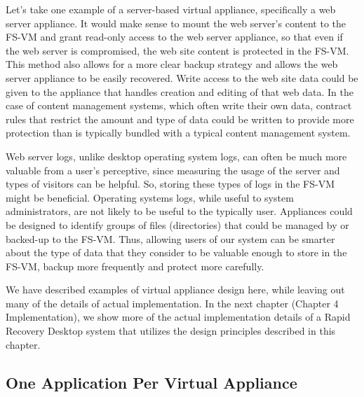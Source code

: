 Let's take one example of a server-based virtual appliance, specifically a web server appliance. It would make sense to mount the web server's content to the FS-VM and grant read-only access to the web server appliance, so that even if the web server is compromised, the web site content is protected in the FS-VM. This method also allows for a more clear backup strategy and allows the web server appliance to be easily recovered. Write access to the web site data could be given to the appliance that handles creation and editing of that web data. In the case of content management systems, which often write their own data, contract rules that restrict the amount and type of data could be written to provide more protection than is typically bundled with a typical content management system.

Web server logs, unlike desktop operating system logs, can often be much more valuable from a user's perceptive, since measuring the usage of the server and types of visitors can be helpful. So, storing these types of logs in the FS-VM might be beneficial. Operating systems logs, while useful to system administrators, are not likely to be useful to the typically user. Appliances could be designed to identify groups of files (directories) that could be managed by or backed-up to the FS-VM. Thus, allowing users of our system can be smarter about the type of data that they consider to be valuable enough to store in the FS-VM, backup more frequently and protect more carefully.

We have described examples of virtual appliance design here, while leaving out many of the details of actual implementation. In the next chapter (Chapter 4 Implementation), we show more of the actual implementation details of a Rapid Recovery Desktop system that utilizes the design principles described in this chapter.

\subsection{One Application Per Virtual Appliance}

